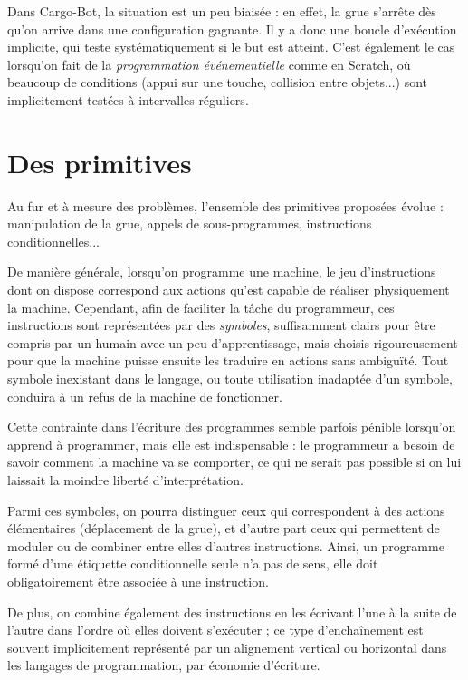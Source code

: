 \documentclass[a4paper,12pt,fleqn]{article}
\begin{document}
Dans Cargo-Bot, la situation est un peu biaisée : en effet, la grue
s'arrête dès qu'on arrive dans une configuration gagnante. Il y a donc une
\og boucle d'exécution \fg implicite, qui teste systématiquement si le
but est atteint. C'est également le cas lorsqu'on fait de la
\emph{programmation événementielle} comme en Scratch, où beaucoup de
conditions (appui sur une touche, collision entre objets...) sont
implicitement testées à intervalles réguliers.

\section*{Des primitives}

Au fur et à mesure des problèmes, l'ensemble des primitives proposées
évolue : manipulation de la grue, appels de sous-programmes,
instructions conditionnelles... 

De manière générale, lorsqu'on programme une machine, le jeu
d'instructions dont on dispose correspond aux actions qu'est capable
de réaliser physiquement la machine. Cependant, afin de faciliter la
tâche du programmeur, ces instructions sont représentées par des
\emph{symboles}, suffisamment clairs pour être compris par un humain
avec un peu d'apprentissage, mais choisis rigoureusement pour que la
machine puisse ensuite les traduire en actions sans ambiguïté. Tout
symbole inexistant dans le langage, ou toute utilisation inadaptée
d'un symbole, conduira à un refus de la machine de fonctionner.

Cette contrainte dans l'écriture des programmes semble parfois pénible
lorsqu'on apprend à programmer, mais elle est indispensable : le
programmeur a besoin de savoir comment la machine va se comporter, ce
qui ne serait pas possible si on lui laissait la moindre liberté
d'interprétation.

\medskip

Parmi ces symboles, on pourra distinguer ceux qui correspondent à des
actions élémentaires (déplacement de la grue), et d'autre part ceux
qui permettent de moduler ou de combiner entre elles d'autres
instructions. Ainsi, un programme formé d'une étiquette conditionnelle
seule n'a pas de sens, elle doit obligatoirement être associée à une
instruction.

De plus, on combine également des instructions en les
écrivant l'une à la suite de l'autre dans l'ordre où elles doivent
s'exécuter ; ce type d'enchaînement est souvent implicitement
représenté par un alignement vertical ou horizontal dans les
langages de programmation, par économie d'écriture.
\end{document}
